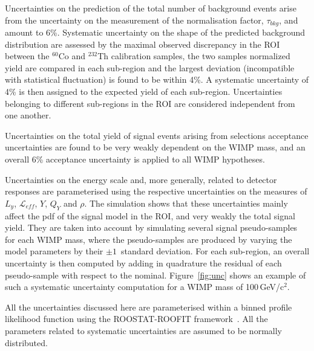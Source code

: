 Uncertainties on the  prediction of the total number of background events arise from the uncertainty on the measurement of the normalisation 
factor, $\tau_{bkg}$, and amount to 6\%. %
Systematic uncertainty on the shape of the predicted background distribution are assessed by the maximal observed discrepancy in the ROI between
the $^{60}$Co and $^{232}$Th calibration samples, the two samples normalized yield are compared in each sub-region and the largest deviation (incompatible
with statistical fluctuation) is found to be within 4\%.  A  systematic uncertainty of 4\% is then assigned  to the expected yield of each sub-region.
Uncertainties belonging to different sub-regions in the ROI are considered independent from one another.

Uncertainties on the total yield of signal events arising from selections acceptance uncertainties are found to be very weakly dependent on 
the WIMP mass, and an overall 6\% acceptance uncertainty is applied to all WIMP hypotheses. 

Uncertainties on the energy scale and, more generally, related to detector responses  are parameterised 
using the respective uncertainties on the measures of $L_y$, $\mathcal{L}_{eff}$, $Y$, $Q_Y$ and $\rho$. The simulation shows 
that these uncertainties mainly affect the pdf of the signal model in the ROI, and very weakly the total signal yield. 
They are taken into account by simulating several signal pseudo-samples for each WIMP mass, where the pseudo-samples are produced 
by varying the model parameters by their $\pm 1$~standard deviation. 
For each sub-region, an overall uncertainty is then computed by adding in quadrature the residual of each pseudo-sample 
with respect to the nominal. Figure~\ref{fig:unc} shows an example of such a systematic uncertainty computation for a WIMP mass of 100\,GeV/c$^2$.


All the uncertainties discussed here are parameterised within a binned profile likelihood function using the ROOSTAT-ROOFIT framework~\cite{roostat,roofit}.
All the parameters related to systematic uncertainties are assumed to be normally distributed.


















